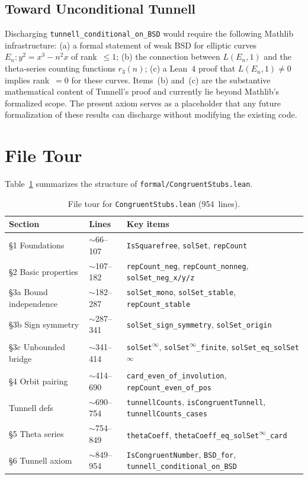 \documentclass[11pt,a4paper]{article}
\theoremstyle{definition}
\newcommand{\lean}[1]{\texttt{#1}}
\begin{document}
\subsection*{Toward Unconditional Tunnell}
\label{sec:future-unconditional}

Discharging \texttt{tunnell\_conditional\_on\_BSD} would require
the following Mathlib infrastructure:
(a) a formal statement of weak BSD for elliptic curves
$E_n : y^2 = x^3 - n^2 x$ of rank~$\leq 1$;
(b) the connection between $L(E_n, 1)$ and the theta-series
counting functions $r_3(n)$;
(c) a Lean~4 proof that $L(E_n, 1) \neq 0$ implies rank~$= 0$
for these curves.
Items~(b) and~(c) are the substantive mathematical content of
Tunnell's proof and currently lie beyond Mathlib's formalized
scope.  The present axiom serves as a placeholder that any
future formalization of these results can discharge without
modifying the existing code.

\appendix
\section{File Tour}\label{app:tour}

Table~\ref{tab:tour} summarizes the structure of
\texttt{formal/CongruentStubs.lean}.

\begin{table}[ht]
\centering
\small
\begin{tabular}{@{}llp{6cm}@{}}
\toprule
\textbf{Section} & \textbf{Lines} & \textbf{Key items} \\
\midrule
\S1 Foundations
  & $\sim$66--107
  & \lean{IsSquarefree}, \lean{solSet}, \lean{repCount} \\
\S2 Basic properties
  & $\sim$107--182
  & \lean{repCount\_neg}, \lean{repCount\_nonneg},
    \lean{solSet\_neg\_x/y/z} \\
\S3a Bound independence
  & $\sim$182--287
  & \lean{solSet\_mono}, \lean{solSet\_stable},
    \lean{repCount\_stable} \\
\S3b Sign symmetry
  & $\sim$287--341
  & \lean{solSet\_sign\_symmetry}, \lean{solSet\_origin} \\
\S3c Unbounded bridge
  & $\sim$341--414
  & \lean{solSet\textsuperscript{$\infty$}},
    \lean{solSet\textsuperscript{$\infty$}\_finite},
    \lean{solSet\_eq\_solSet\textsuperscript{$\infty$}} \\
\S4 Orbit pairing
  & $\sim$414--690
  & \lean{card\_even\_of\_involution},
    \lean{repCount\_even\_of\_pos} \\
Tunnell defs
  & $\sim$690--754
  & \lean{tunnellCounts}, \lean{isCongruentTunnell},
    \lean{tunnellCounts\_cases} \\
\S5 Theta series
  & $\sim$754--849
  & \lean{thetaCoeff},
    \lean{thetaCoeff\_eq\_solSet\textsuperscript{$\infty$}\_card} \\
\S6 Tunnell axiom
  & $\sim$849--954
  & \lean{IsCongruentNumber}, \lean{BSD\_for},
    \lean{tunnell\_conditional\_on\_BSD} \\
\bottomrule
\end{tabular}
\caption{File tour for \texttt{CongruentStubs.lean} (954~lines).}
\label{tab:tour}
\end{table}
\end{document}
